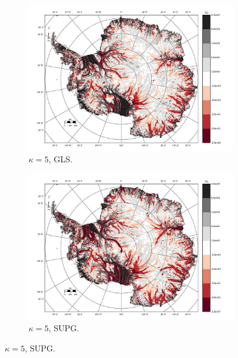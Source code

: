 \begin{figure}
  \begin{subfigure}[b]{0.45\linewidth}
    \includegraphics[width=\linewidth]{images/balance_velocity/antarctica/d_gS_m_U/misfit_10H_kappa_5_GLS.jpg}
  \caption{$\kappa = 5$, GLS.}
  \label{antarctica_bv_image_kappa_5_GLS_gS_m_U_misfit}
  \end{subfigure}
  \begin{subfigure}[b]{0.45\linewidth}
    \includegraphics[width=\linewidth]{images/balance_velocity/antarctica/d_gS_m_U/misfit_10H_kappa_5_SUPG.jpg}
  \caption{$\kappa = 5$, SUPG.}
  \label{antarctica_bv_image_kappa_5_SUPG_gS_m_U_misfit}
  \end{subfigure}


\end{figure}
